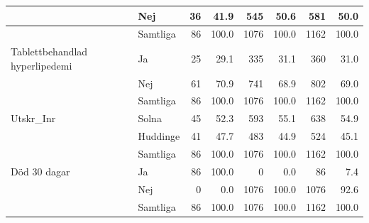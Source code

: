 \begin{table}[htbp]
{\begin{tabular}{ll|rr|rr|rr}
   & Nej & 36 & 41.9 & 545 & 50.6 & 581 & 50.0 \\ 
   \hline
 & Samtliga & 86 & 100.0 & 1076 & 100.0 & 1162 & 100.0 \\ 
   \hline
\hline
Tablettbehandlad hyperlipedemi & Ja & 25 & 29.1 & 335 & 31.1 & 360 & 31.0 \\ 
   & Nej & 61 & 70.9 & 741 & 68.9 & 802 & 69.0 \\ 
   \hline
 & Samtliga & 86 & 100.0 & 1076 & 100.0 & 1162 & 100.0 \\ 
   \hline
\hline
Utskr\_Inr & Solna & 45 & 52.3 & 593 & 55.1 & 638 & 54.9 \\ 
   & Huddinge & 41 & 47.7 & 483 & 44.9 & 524 & 45.1 \\ 
   \hline
 & Samtliga & 86 & 100.0 & 1076 & 100.0 & 1162 & 100.0 \\ 
   \hline
\hline
Död 30 dagar & Ja & 86 & 100.0 & 0 & 0.0 & 86 & 7.4 \\ 
   & Nej & 0 & 0.0 & 1076 & 100.0 & 1076 & 92.6 \\ 
   \hline
 & Samtliga & 86 & 100.0 & 1076 & 100.0 & 1162 & 100.0 \\ 
   \hline
\hline
\end{tabular}
}
\end{table}

